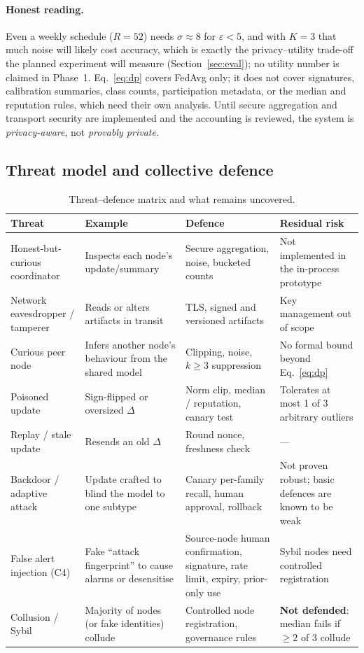 \documentclass[11pt,a4paper]{article}
\newcommand{\hdr}{\rowcolor{emblue!15}}
\begin{document}
\paragraph{Honest reading.} Even a weekly schedule ($R=52$) needs $\sigma\!\approx\!8$ for $\varepsilon<5$, and with $K=3$ that much noise will likely cost accuracy, which is exactly the privacy--utility trade-off the planned experiment will measure (Section~\ref{sec:eval}); no utility number is claimed in Phase~1. Eq.~\eqref{eq:dp} covers FedAvg only; it does not cover signatures, calibration summaries, class counts, participation metadata, or the median and reputation rules, which need their own analysis. Until secure aggregation and transport security are implemented and the accounting is reviewed, the system is \emph{privacy-aware}, not \emph{provably private}.

\subsection{Threat model and collective defence}

\begin{table}[H]
\centering\small
\caption{Threat--defence matrix and what remains uncovered.}
\label{tab:threats}
\begin{tabularx}{\textwidth}{@{}p{3.1cm} Y Y Y@{}}
\toprule\hdr
Threat & Example & Defence & Residual risk \\
\midrule
Honest-but-curious coordinator & Inspects each node's update/summary & Secure aggregation, noise, bucketed counts & Not implemented in the in-process prototype \\
Network eavesdropper / tamperer & Reads or alters artifacts in transit & TLS, signed and versioned artifacts & Key management out of scope \\
Curious peer node & Infers another node's behaviour from the shared model & Clipping, noise, $k\!\ge\!3$ suppression & No formal bound beyond Eq.~\eqref{eq:dp} \\
Poisoned update & Sign-flipped or oversized $\Delta$ & Norm clip, median / reputation, canary test & Tolerates at most 1 of 3 arbitrary outliers \\
Replay / stale update & Resends an old $\Delta$ & Round nonce, freshness check & --- \\
Backdoor / adaptive attack & Update crafted to blind the model to one subtype~\cite{bagdasaryan2020} & Canary per-family recall, human approval, rollback & Not proven robust; basic defences are known to be weak \\
False alert injection (C4) & Fake ``attack fingerprint'' to cause alarms or desensitise & Source-node human confirmation, signature, rate limit, expiry, prior-only use & Sybil nodes need controlled registration \\
Collusion / Sybil & Majority of nodes (or fake identities) collude & Controlled node registration, governance rules & \textbf{Not defended}: median fails if $\ge2$ of 3 collude \\
\bottomrule
\end{tabularx}
\end{table}
\end{document}
